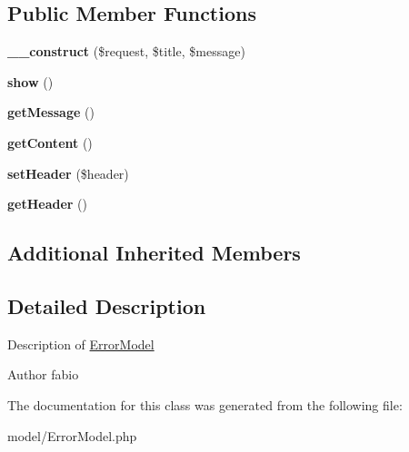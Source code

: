 \subsection*{Public Member Functions}
\begin{DoxyCompactItemize}
\item 
\hypertarget{classErrorModel_a22e4c07ecb9ba26bf0592583389f5cad}{{\bfseries \+\_\+\+\_\+construct} (\$request, \$title, \$message)}\label{classErrorModel_a22e4c07ecb9ba26bf0592583389f5cad}

\item 
\hypertarget{classErrorModel_af4f6e8ad91bdff9b86769ad4ea01f7f5}{{\bfseries show} ()}\label{classErrorModel_af4f6e8ad91bdff9b86769ad4ea01f7f5}

\item 
\hypertarget{classErrorModel_a01701980e78f4d77cdf11e88e4506507}{{\bfseries get\+Message} ()}\label{classErrorModel_a01701980e78f4d77cdf11e88e4506507}

\item 
\hypertarget{classErrorModel_a1bb43423f160f44504fbbc9750f47087}{{\bfseries get\+Content} ()}\label{classErrorModel_a1bb43423f160f44504fbbc9750f47087}

\item 
\hypertarget{classErrorModel_a8d3bc764cfde8e9f70d13f91796e1621}{{\bfseries set\+Header} (\$header)}\label{classErrorModel_a8d3bc764cfde8e9f70d13f91796e1621}

\item 
\hypertarget{classErrorModel_a1fd5e86a80a654f464811fde25b5928f}{{\bfseries get\+Header} ()}\label{classErrorModel_a1fd5e86a80a654f464811fde25b5928f}

\end{DoxyCompactItemize}
\subsection*{Additional Inherited Members}


\subsection{Detailed Description}
Description of \hyperlink{classErrorModel}{Error\+Model}

\begin{DoxyAuthor}{Author}
fabio 
\end{DoxyAuthor}


The documentation for this class was generated from the following file\+:\begin{DoxyCompactItemize}
\item 
model/Error\+Model.\+php\end{DoxyCompactItemize}
